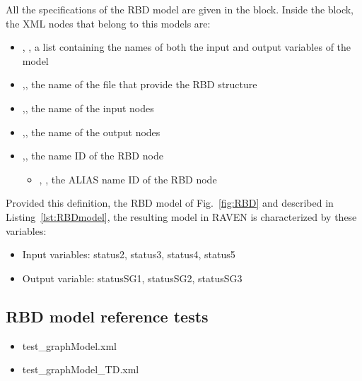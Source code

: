 All the specifications of the RBD model are given in the 
 block. 
Inside the  block, the XML
nodes that belong to this models are:
\begin{itemize}
  \item  {}, , a list containing the names of both the input and output variables of the model
  \item  {},, the name of the file that provide the RBD structure
  \item  {},, the name of the input nodes
  \item  {},, the name of the output nodes
  \item  {},, the name ID of the RBD node
	  \begin{itemize}
	    \item {}, , the ALIAS name ID of the RBD node
	  \end{itemize}
\end{itemize}

Provided this definition, the RBD model of Fig.~\ref{fig:RBD} and described in Listing~\ref{lst:RBDmodel}, 
the resulting model in RAVEN is characterized by these variables:
\begin{itemize}
	\item Input variables: status2, status3, status4, status5
	\item Output variable: statusSG1, statusSG2, statusSG3
\end{itemize}

\subsection{RBD model reference tests}
\begin{itemize}
	\item test\_graphModel.xml
	\item test\_graphModel\_TD.xml
\end{itemize}
